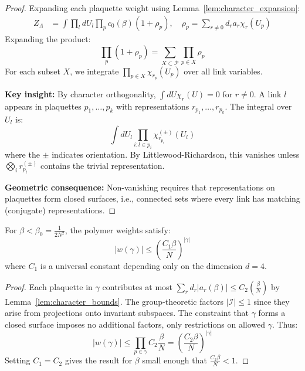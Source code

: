 \begin{proof}
Expanding each plaquette weight using Lemma~\ref{lem:character_expansion}:
\begin{align}
Z_\Lambda &= \int \prod_l dU_l \prod_p c_0(\beta)(1 + \rho_p), \quad \rho_p = \sum_{r \neq 0} d_r a_r \chi_r(U_p)
\end{align}
Expanding the product:
\begin{equation}
\prod_p (1 + \rho_p) = \sum_{X \subset \mathcal{P}} \prod_{p \in X} \rho_p
\end{equation}
For each subset $X$, we integrate $\prod_{p \in X} \chi_{r_p}(U_p)$ over all link variables.

\textbf{Key insight:} By character orthogonality, $\int dU \chi_r(U) = 0$ for $r \neq 0$. A link $l$ appears in plaquettes $p_1, \ldots, p_k$ with representations $r_{p_1}, \ldots, r_{p_k}$. The integral over $U_l$ is:
\begin{equation}
\int dU_l \prod_{i: l \in p_i} \chi_{r_{p_i}}^{(\pm)}(U_l)
\end{equation}
where the $\pm$ indicates orientation. By Littlewood-Richardson, this vanishes unless $\bigotimes_i r_{p_i}^{(\pm)}$ contains the trivial representation.

\textbf{Geometric consequence:} Non-vanishing requires that representations on plaquettes form closed surfaces, i.e., connected sets where every link has matching (conjugate) representations.
\end{proof}

\begin{lemma}
\label{lem:polymer_bounds}
For $\beta < \beta_0 = \frac{1}{2N^2}$, the polymer weights satisfy:
\begin{equation}
|w(\gamma)| \leq \left(\frac{C_1 \beta}{N}\right)^{|\gamma|}
\end{equation}
where $C_1$ is a universal constant depending only on the dimension $d=4$.
\end{lemma}

\begin{proof}
Each plaquette in $\gamma$ contributes at most $\sum_r d_r |a_r(\beta)| \leq C_2(\frac{\beta}{N})$ by Lemma~\ref{lem:character_bounds}. The group-theoretic factors $|\mathcal{I}| \leq 1$ since they arise from projections onto invariant subspaces. The constraint that $\gamma$ forms a closed surface imposes no additional factors, only restrictions on allowed $\gamma$. Thus:
\begin{equation}
|w(\gamma)| \leq \prod_{p \in \gamma} C_2 \frac{\beta}{N} = \left(\frac{C_2\beta}{N}\right)^{|\gamma|}
\end{equation}
Setting $C_1 = C_2$ gives the result for $\beta$ small enough that $\frac{C_2\beta}{N} < 1$.
\end{proof}

